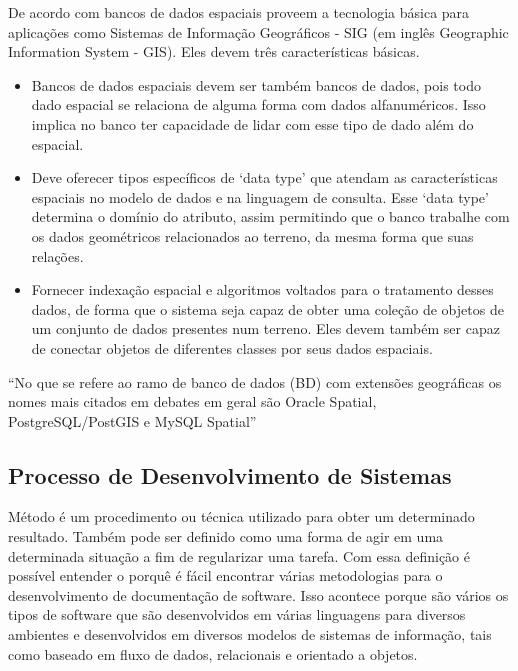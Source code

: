 De acordo com  bancos de dados espaciais proveem a tecnologia básica para aplicações como Sistemas de Informação Geográficos - SIG (em inglês Geographic Information System - GIS). Eles devem três características básicas. 
\begin{itemize}
    \item Bancos de dados espaciais devem ser também bancos de dados, pois todo dado espacial se relaciona de alguma forma com dados alfanuméricos. Isso implica no banco ter capacidade de lidar com esse tipo de dado além do espacial.
    \item Deve oferecer tipos específicos de `data type' que atendam as características espaciais no modelo de dados e na linguagem de consulta. Esse `data type' determina o domínio do atributo, assim permitindo que o banco trabalhe com os dados geométricos relacionados ao terreno, da mesma forma que suas relações.
    \item Fornecer indexação espacial e algoritmos voltados para o tratamento desses dados, de forma que o sistema seja capaz de obter uma coleção de objetos de um conjunto de dados presentes num terreno. Eles devem também ser capaz de conectar objetos de diferentes classes por seus dados espaciais.
\end{itemize}

``No que se refere ao ramo de banco de dados (BD) com extensões geográficas os nomes mais citados em debates em geral são Oracle Spatial, PostgreSQL/PostGIS e MySQL Spatial'' \cite[P.1]{clickgeosgbd}

\subsection{Processo de Desenvolvimento de Sistemas} \label{proc}

\begin{citacao}
Método é um procedimento ou técnica utilizado para obter um determinado resultado. Também pode ser definido como uma forma de agir em uma determinada situação a fim de regularizar uma tarefa. Com essa definição é possível entender o porquê é fácil encontrar várias metodologias para o desenvolvimento de documentação de software. Isso acontece porque são vários os tipos de software que são desenvolvidos em várias linguagens para diversos ambientes e desenvolvidos em diversos modelos de sistemas de informação, tais como baseado em fluxo de dados, relacionais e orientado a objetos. \cite[p.402]{keila2010metodologias}
 \end{citacao}
 

